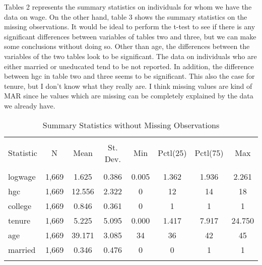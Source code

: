 \documentclass{article}
\begin{document}
Tables 2 represents the summary statistics on individuals for whom we have the data on wage. On the other hand, table 3 shows the summary statistics on the missing observations. It would be ideal to perform the t-test to see if there is any significant differences between variables of tables two and three, but we can make some conclusions without doing so. Other than age, the differences between the variables of the two tables look to be significant. The data on individuals who are either married or uneducated tend to be not reported. In addition, the difference between hgc in table two and three seems to be significant. This also the case for tenure, but I don't know what they really are. I think missing values are kind of MAR since he values which are missing can be completely explained by the data we already have. 
\begin{table}[!htbp] \centering 
  \caption{Summary Statistics without Missing Observations} 
  \label{} 
\begin{tabular}{@{\extracolsep{5pt}}lccccccc} 
\\[-1.8ex]\hline 
\hline \\[-1.8ex] 
Statistic & \multicolumn{1}{c}{N} & \multicolumn{1}{c}{Mean} & \multicolumn{1}{c}{St. Dev.} & \multicolumn{1}{c}{Min} & \multicolumn{1}{c}{Pctl(25)} & \multicolumn{1}{c}{Pctl(75)} & \multicolumn{1}{c}{Max} \\ 
\hline \\[-1.8ex] 
logwage & 1,669 & 1.625 & 0.386 & 0.005 & 1.362 & 1.936 & 2.261 \\ 
hgc & 1,669 & 12.556 & 2.322 & 0 & 12 & 14 & 18 \\ 
college & 1,669 & 0.846 & 0.361 & 0 & 1 & 1 & 1 \\ 
tenure & 1,669 & 5.225 & 5.095 & 0.000 & 1.417 & 7.917 & 24.750 \\ 
age & 1,669 & 39.171 & 3.085 & 34 & 36 & 42 & 45 \\ 
married & 1,669 & 0.346 & 0.476 & 0 & 0 & 1 & 1 \\ 
\hline \\[-1.8ex] 
\end{tabular} 
\end{table} 
\end{document}
